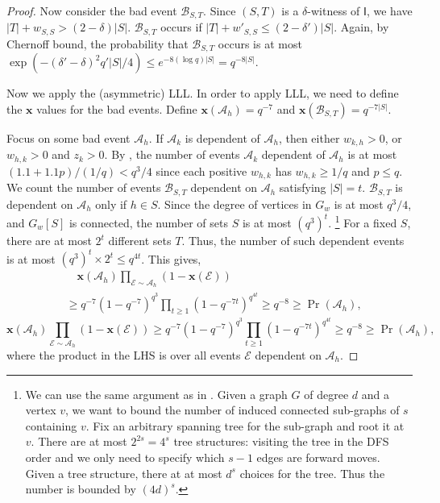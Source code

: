 \documentclass[11pt]{article}
\newcommand{\cardinal}[1]{\left|#1\right|}
\newcommand{\calA}{{\mathscr A}}
\newcommand{\calB}{{\mathscr B}}
\newcommand{\cA}{{\mathscr A}}
\newcommand{\cE}{{\mathscr E}}
\newcommand{\cI}{{\mathsf I}}
\newcommand{\x}{{\mathbf x}}
\begin{document}
\begin{proof}
Now consider the bad event ${\calB}_{S, T}$. Since $(S, T)$ is a $\delta$-witness of $\cI$, we have $\cardinal{T} + {w_{S,S}} > (2-\delta)\cardinal{S}$.   ${\calB}_{S, T}$ occurs if $\cardinal{T} + {w'_{S,S}} \leq (2-\delta')\cardinal{S}$. Again, by Chernoff bound, the probability that ${\calB}_{S, T}$ occurs is at most $\exp\left(-(\delta' - \delta)^2q'\cardinal{S} /4\right) \leq e^{-8(\log q)\cardinal{S}} = q^{-8\cardinal{S}}$.

Now we apply the (asymmetric) LLL. In order to apply LLL, we need to define the $\x$ values for the bad events. 
Define $\x({\calA}_h) = q^{-7}$ and $\x({\calB}_{S, T}) = q^{-7\cardinal{S}}$. 

Focus on some bad event ${\calA}_h$. If ${\calA}_k$ is dependent of ${\calA}_h$, then either $w_{k, h} > 0$, or $w_{h, k} > 0$ and $z_k > 0$. By , the number of events ${\calA}_{k}$ dependent of ${\calA}_h$ is at most $(1.1 + 1.1p)/(1/q) < q^3/4$ since each positive $w_{h,k}$ has $w_{h,k} \geq 1/q$ and $p\leq q$.  We count the number of events ${\calB}_{S, T}$ dependent on ${\calA}_h$ satisfying $\cardinal{S} = t$.  ${\calB}_{S,T}$ is dependent on ${\calA}_h$ only if $h \in S$. Since the degree of vertices in $G_w$ is at most $q^3/4$, and $G_w[S]$ is connected, the number of sets $S$ is at most $(q^3)^t$. \footnote{We can use the same argument as in \cite{Fei08}. Given a graph $G$ of degree $d$ and a vertex $v$, we want to bound the number of induced connected sub-graphs of $s$ containing $v$. Fix an arbitrary spanning tree for the sub-graph and root it at $v$. There are at most $2^{2s} = 4^s$ tree structures: visiting the tree in the DFS order and we only need to specify which $s-1$ edges are forward moves. Given a tree structure, there at at most $d^s$ choices for the tree. Thus the number is bounded by $(4d)^s$.} 
For a fixed $S$, there are at most $2^t$ different sets $T$.  Thus, the number of such dependent events is at most $(q^3)^t \times 2^t \leq q^{4t}$.  This gives, 
\ifdefined\CR
\begin{align*}
&\quad \x\left({\calA}_h\right)\prod_{{\cE}\sim {\calA}_h}\left(1 - \x({\cE})\right)\\
&\geq q^{-7} \left(1 - q^{-7}\right)^{q^3}\prod_{t \geq 1}\left(1 - q^{-7t}\right)^{q^{4t}} \geq q^{-8} \geq \Pr({\calA}_h),
\end{align*}
\else
\[
\x\left({\calA}_h\right)\prod_{{\cE}\sim {\calA}_h}\left(1 - \x({\cE})\right) \geq q^{-7} \left(1 - q^{-7}\right)^{q^3}\prod_{t \geq 1}\left(1 - q^{-7t}\right)^{q^{4t}} \geq q^{-8} \geq \Pr({\calA}_h),
\]
\fi
where the product in the LHS is over all events $\cE$ dependent on $\cA_h$.  


\end{proof}
\end{document}
